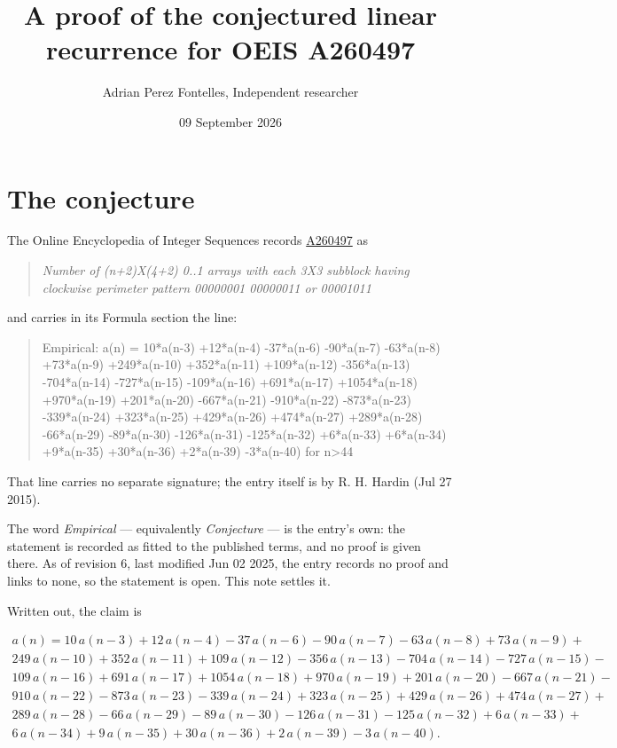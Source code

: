 \documentclass[11pt]{article}
\title{A proof of the conjectured linear recurrence for OEIS A260497}
\author{Adrian Perez Fontelles, Independent researcher}
\date{09 September 2026}
\theoremstyle{definition}
\begin{document}
\maketitle
\section{The conjecture}

The Online Encyclopedia of Integer Sequences records \href{https://oeis.org/A260497}{A260497} as

\begin{quote}\itshape Number of (n+2)X(4+2) 0..1 arrays with each 3X3 subblock having clockwise perimeter pattern 00000001 00000011 or 00001011\end{quote}

and carries in its Formula section the line:

\begin{quote}\ttfamily Empirical: a(n) = 10*a(n-3) +12*a(n-4) -37*a(n-6) -90*a(n-7) -63*a(n-8) +73*a(n-9) +249*a(n-10) +352*a(n-11) +109*a(n-12) -356*a(n-13) -704*a(n-14) -727*a(n-15) -109*a(n-16) +691*a(n-17) +1054*a(n-18) +970*a(n-19) +201*a(n-20) -667*a(n-21) -910*a(n-22) -873*a(n-23) -339*a(n-24) +323*a(n-25) +429*a(n-26) +474*a(n-27) +289*a(n-28) -66*a(n-29) -89*a(n-30) -126*a(n-31) -125*a(n-32) +6*a(n-33) +6*a(n-34) +9*a(n-35) +30*a(n-36) +2*a(n-39) -3*a(n-40) for n>44\end{quote}

That line carries no separate signature; the entry itself is by R. H. Hardin (Jul 27 2015).

The word {\itshape Empirical} --- equivalently {\itshape Conjecture} --- is the entry's own: the statement is recorded as fitted to the published terms, and no proof is given there. As of revision 6, last modified Jun 02 2025, the entry records no proof and links to none, so the statement is open. This note settles it.

Written out, the claim is

\begin{multline*} a(n) = 10\,a(n-3) + 12\,a(n-4) - 37\,a(n-6) - 90\,a(n-7) - 63\,a(n-8) + 73\,a(n-9) + \\ 249\,a(n-10) + 352\,a(n-11) + 109\,a(n-12) - 356\,a(n-13) - 704\,a(n-14) - 727\,a(n-15) - \\ 109\,a(n-16) + 691\,a(n-17) + 1054\,a(n-18) + 970\,a(n-19) + 201\,a(n-20) - 667\,a(n-21) - \\ 910\,a(n-22) - 873\,a(n-23) - 339\,a(n-24) + 323\,a(n-25) + 429\,a(n-26) + 474\,a(n-27) + \\ 289\,a(n-28) - 66\,a(n-29) - 89\,a(n-30) - 126\,a(n-31) - 125\,a(n-32) + 6\,a(n-33) + \\ 6\,a(n-34) + 9\,a(n-35) + 30\,a(n-36) + 2\,a(n-39) - 3\,a(n-40). \end{multline*}
\end{document}
